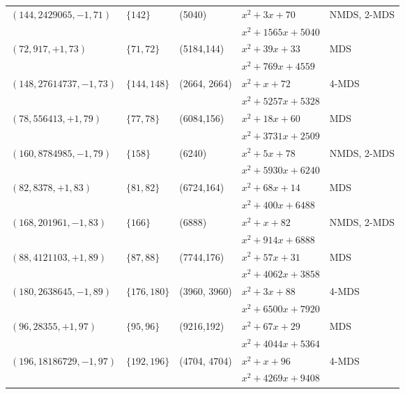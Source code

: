\documentclass[12pt,reqno]{amsart}
\begin{document}
\begin{table}[htbp]
{\begin{tabular}{lllll}
		$(144,2429065,-1,71)$ & $\{142\}$ & (5040) &  $x^2 + 3x +70$ & NMDS, 2-MDS \\
& & & $x^2 + 1565x + 5040$ & \\
\hline

		$(72,917,+1,73)$ & $\{71,72\}$ & (5184,144) &  $x^2 +39x +33$ & MDS\\
& & & $x^2 + 769x + 4559$ & \\

		$(148,27614737,-1,73)$ & $\{144, 148\}$ & (2664, 2664) &  $x^2 + x +72$ & 4-MDS\\
& & & $x^2 + 5257x + 5328$ & \\
\hline
		$(78,556413,+1,79)$ & $\{77,78\}$ & (6084,156) &  $x^2 +18x +60$ & MDS\\
& & & $x^2 + 3731x + 2509$ & \\


		$(160,8784985,-1,79)$ & $\{158\}$ & (6240) &  $x^2 + 5x +78$  & NMDS, 2-MDS \\
& & & $x^2 + 5930x + 6240$ & \\
\hline
		$(82,8378,+1,83)$ & $\{81,82\}$ & (6724,164) &  $x^2 +68x +14$ & MDS\\
& & & $x^2 + 400x + 6488$ & \\

		$(168,201961,-1,83)$ & $\{166\}$ & (6888) &  $x^2 + x +82$ & NMDS, 2-MDS \\
& & & $x^2 + 914x + 6888$ & \\
\hline
		$(88,4121103,+1,89)$ & $\{87,88\}$ & (7744,176) &  $x^2 +57x +31$ & MDS\\
& & & $x^2 + 4062x + 3858$ & \\

		$(180,2638645,-1,89)$ & $\{176,180\}$ & (3960, 3960) &  $x^2 + 3x +88$ & 4-MDS\\
& & & $x^2 + 6500x + 7920$ & \\
\hline
		$(96,28355,+1,97)$ & $\{95,96\}$ & (9216,192) &  $x^2 +67x +29$ & MDS\\
& & & $x^2 + 4044x + 5364$ & \\

		$(196,18186729,-1,97)$ & $\{192, 196\}$ & (4704, 4704) &  $x^2 + x +96$ & 4-MDS\\
& & & $x^2 + 4269x + 9408$ & \\
\bottomrule



\end{tabular}}
\end{table}
\end{document}
